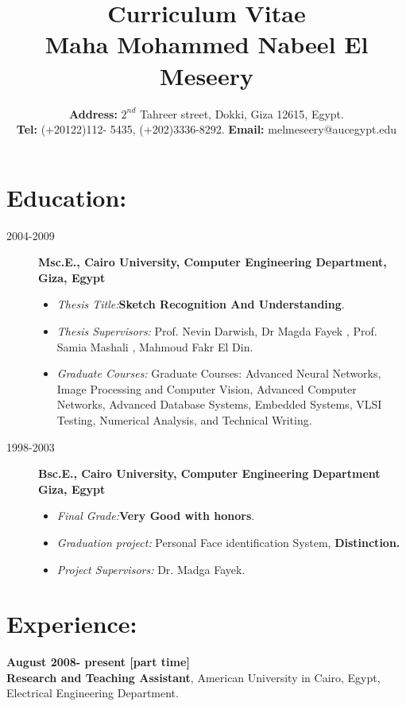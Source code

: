 \documentclass{article}
\title {Curriculum Vitae \\ \LARGE Maha Mohammed Nabeel El Meseery }
\date{\textbf{ Address:} $2^{nd}$ Tahreer street, Dokki, Giza 12615,
Egypt. \\ \textbf{Tel:} (+20122)112- 5435, (+202)3336-8292.
\textbf{Email:} melmeseery@aucegypt.edu}
\begin{document}
\maketitle
\hline 
\hline 
 \section*{Education:}
  \begin{description}
\item [2004-2009]  \textbf{Msc.E., Cairo University, Computer Engineering Department, Giza, Egypt}
  \begin{itemize}
    \item \textit{ Thesis Title:}\textbf{Sketch Recognition And Understanding}.
    \item \textit{Thesis Supervisors:} Prof. Nevin Darwish, Dr Magda Fayek , Prof. Samia
 Mashali , Mahmoud Fakr El Din.
  \item \textit{ Graduate Courses:} Graduate Courses: Advanced Neural Networks, Image
  Processing and Computer Vision, Advanced Computer Networks, Advanced Database Systems, Embedded Systems, VLSI Testing, Numerical Analysis, and Technical Writing.

\end{itemize}

 \item[1998-2003]  \textbf{ Bsc.E., Cairo University, Computer Engineering Department Giza, Egypt}
   \begin{itemize}
    \item \textit{Final Grade:}\textbf{Very Good with honors}.
  \item \textit{Graduation project:} Personal Face identification System, \textbf{Distinction.}
  \item \textit{Project Supervisors:} Dr. Madga Fayek.
\end{itemize}
  \end{description}

 \section*{Experience:}
 \textbf{August 2008- present [part time]}\\
 \textbf{Research and Teaching Assistant}, American University in Cairo, Egypt,
 Electrical Engineering Department.
\end{document}
